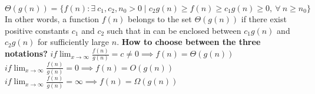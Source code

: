\documentclass[14pt]{article}
\begin{document}
$\Theta(g(n)) = \{f(n) : \exists \ c_1, c_2, n_0 > 0 \mid c_2 g(n) \geq f(n) \geq c_1 g(n) \geq 0, \ \forall \ n \geq n_0\}$ \newline \newline
In other words, a function $f(n)$ belongs to the set $\Theta(g(n))$ if there exist positive constants $c_1$ and $c_2$
such that in can be enclosed between $c_1 g(n)$ and $c_2 g(n)$ for sufficiently large $n$. \newpage
\hspace*{-8mm} \textbf{How to choose between the three notations?} \newline \newline
$if \displaystyle{\lim_{x \to \infty}} \frac{f(n)}{g(n)} = c \neq 0 \implies f(n) = \Theta(g(n))$ \newline
$if \displaystyle{\lim_{x \to \infty}} \frac{f(n)}{g(n)} = 0 \implies f(n) = O(g(n))$ \newline
$if \displaystyle{\lim_{x \to \infty}} \frac{f(n)}{g(n)} = \infty \implies f(n) = \Omega(g(n))$ \newline
\end{document}
